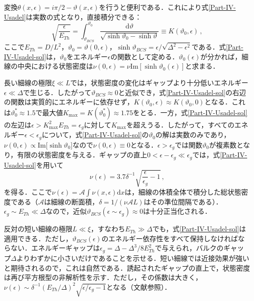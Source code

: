 \documentclass[a4paper,11pt]{ltjsarticle}
\def\d{\mathrm{d}}
\begin{document}
変換$\theta(x,\epsilon)=i\pi/2-\vartheta(x,\epsilon)$を行うと便利である．これにより式\eqref{Part-IV-Usadel}は実数の式となり，直接積分できる：
\begin{equation}\label{Part-IV-Usadel-sol}
\sqrt{\frac{\epsilon}{E_{Th}}}=\int^{\vartheta_{0}}_{\vartheta_{BCS}}
\frac{\d\vartheta}{\sqrt{\sinh\vartheta_{0}-\sinh\vartheta}}
\equiv K(\vartheta_{0},\epsilon)\,,
\end{equation}
ここで$E_{Th}= D/L^2$，$\vartheta_{0}=\vartheta(0,\epsilon)$，$\sinh\vartheta_{BCS}=\epsilon/\sqrt{\Delta^2-\epsilon^{2}}$である．式\eqref{Part-IV-Usadel-sol}は，$\vartheta_{0}$をエネルギー$\epsilon$の関数として定める．$\vartheta_{0}(\epsilon)$が分かれば，細線の中央における状態密度は$\nu(0,\epsilon)=\nu\mathrm{Im}[\sinh\vartheta_{0}(\epsilon)]$と求まる．


長い細線の極限$\xi\ll L$では，状態密度の変化はギャップより十分低いエネルギー$\epsilon\ll\Delta$で生じる．したがって$\vartheta_{BCS}\approx0$と近似でき，式\eqref{Part-IV-Usadel-sol}の右辺の関数は実質的にエネルギーに依存せず，$K(\vartheta_{0},\epsilon)\approx K(\vartheta_0,0)$となる．これは$\vartheta^{*}_{0}\approx1.5$で最大値$K_{\mathrm{max}}=K(\vartheta^{*}_{0})\approx1.75$をとる．一方，式\eqref{Part-IV-Usadel-sol}の左辺は$\epsilon>K^{2}_{\mathrm{max}}E_{Th}=\epsilon_{g}$に対して$K_{\mathrm{max}}$を超えうる．したがって，すべてのエネルギー$\epsilon<\epsilon_{g}$について，式\eqref{Part-IV-Usadel-sol}の$\vartheta_{0}$の解は実数のみであり，$\nu(0,\epsilon)\propto\mathrm{Im}\big[\sinh\vartheta_{0}\big]$なので$\nu(0,\epsilon)\equiv0$となる．$\epsilon>\epsilon_{g}$では関数$\vartheta_{0}$が複素数となり，有限の状態密度を与える．ギャップの直上$0 <\epsilon-\epsilon_{g}\ll\epsilon_{g}$では，式\eqref{Part-IV-Usadel-sol}を用いて
\begin{equation}
\nu(\epsilon)=3.7\delta^{-1}\sqrt{\frac{\epsilon}{\epsilon_{g}}-1}\,,
\end{equation}
を得る．ここで$\nu(\epsilon)=\mathcal{A}\int\nu(x,\epsilon)\d x$は，細線の体積全体で積分した総状態密度である（$\mathcal{A}$は細線の断面積，$\delta=1/(\nu\mathcal{A}L)$はその準位間隔である）．$\epsilon_{g}\sim E_{Th}\ll\Delta$なので，近似$\vartheta_{BCS}(\epsilon\sim\epsilon_{g})\approx0$は十分正当化される．


反対の短い細線の極限$L\ll\xi$，すなわち$E_{Th}\gg\Delta$でも，式\eqref{Part-IV-Usadel-sol}は適用できる．ただし，$\vartheta_{BCS}(\epsilon)$のエネルギー依存性をすべて保持しなければならない．エネルギーギャップは$\epsilon_{g}=\Delta-\Delta^{3}/8E^{2}_{Th}$で与えられ，バルクのギャップ$\Delta$よりわずかに小さいだけであることを示せる．短い細線では近接効果が強いと期待されるので，これは自然である．誘起されたギャップの直上で，状態密度は再び平方根型の非解析性を示す．ただし，その係数は大きく，$\nu(\epsilon)\sim \delta^{-1}(E_{Th}/\Delta)^{2} \sqrt{\epsilon/\epsilon_{g}-1}$となる（文献\cite{Levchenko-DOS}参照）．
\end{document}
